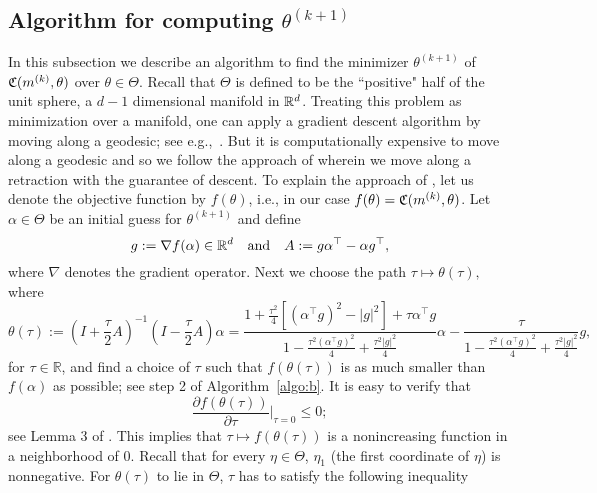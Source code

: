 \subsection{Algorithm for computing \texorpdfstring{$\theta^{(k+1)}$}{Lg}} \label{sec:ThetaGradDesc}
In this subsection we describe an algorithm to find the minimizer $\theta^{(k+1)}$ of $\mathfrak{C}(m^{(k)},\theta)$ over $\theta\in\Theta$. Recall that $\Theta$ is defined to be the ``positive" half of the unit sphere, a $d-1$ dimensional manifold in $\mathbb{R}^d$. Treating this problem as minimization over a manifold, one can apply a gradient descent algorithm by moving along a geodesic; see e.g.,~\citet[Section 3.3]{SAM}. But it is computationally expensive to move along a geodesic and so we follow the approach of \cite{WEN} wherein we move along a retraction with the guarantee of descent. To explain the approach of \cite{WEN}, let us denote the objective function by $f(\theta)$, i.e., in our case $f(\theta)=\mathfrak{C}(m^{(k)},\theta)$. Let $\alpha \in \Theta$ be an initial guess for $\theta^{(k+1)}$ and define 
\[
  g := \nabla f(\alpha) \in \mathbb{R}^d \quad\mbox{and}\quad A := g\alpha^{\top} - \alpha g^{\top},
\]
where $\nabla$ denotes the gradient operator.
Next we choose the path $\tau\mapsto \theta(\tau),$ where
\[
\theta(\tau) := \left(I + \frac{\tau}{2}A\right)^{-1}\left(I - \frac{\tau}{2}A\right)\alpha = \frac{1 + \frac{\tau^2}{4}[(\alpha^{\top}g)^2 - |g|^2] + \tau \alpha^{\top}g}{1 - \frac{\tau^2(\alpha^{\top}g)^2}{4} + \frac{\tau^2|g|^2}{4}}\alpha - \frac{\tau}{1 - \frac{\tau^2(\alpha^{\top}g)^2}{4} + \frac{\tau^2|g|^2}{4}}g,
\]
for $\tau\in\mathbb{R}$, and find a choice of $\tau$ such that $f(\theta(\tau))$ is as much smaller than $f(\alpha)$ as possible; see step 2 of Algorithm~\ref{algo:b}. It is easy to verify that
$$
\frac{\partial f(\theta(\tau))}{\partial \tau}\bigg|_{\tau = 0} \le 0;$$
see Lemma 3 of \cite{WEN}. This implies that $\tau \mapsto f(\theta(\tau))$ is a nonincreasing function in a neighborhood of $0$. %
Recall that for every $\eta\in\Theta$, $\eta_1$ (the first coordinate of $\eta$) is nonnegative. For $\theta(\tau)$ to lie in $\Theta$,  $\tau$ has to satisfy the following inequality
